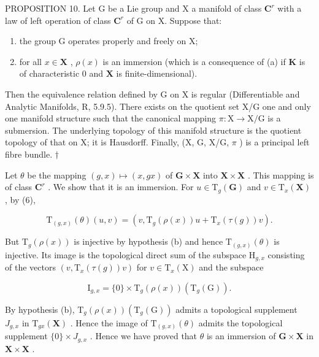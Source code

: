 PROPOSITION 10. Let G be a Lie group and X a manifold of class \(\mathbf{C}^r\) with a law of left operation of class \(\mathbf{C}^r\) of G on X. Suppose that:

\begin{enumerate}
\def\labelenumi{(\alph{enumi})}
\item
  the group G operates properly and freely on X;
\item
  for all \(x \in \mathbf{X}\) , \(\rho(x)\) is an immersion (which is a consequence of (a) if \(\mathbf{K}\) is of characteristic 0 and \(\mathbf{X}\) is finite-dimensional).
\end{enumerate}

Then the equivalence relation defined by G on X is regular (Differentiable and Analytic Manifolds, R, 5.9.5). There exists on the quotient set X/G one and only one manifold structure such that the canonical mapping \(\pi: \mathrm{X} \to \mathrm{X} / \mathrm{G}\) is a submersion. The underlying topology of this manifold structure is the quotient topology of that on X; it is Hausdorff. Finally, (X, G, X/G, \(\pi\) ) is a principal left fibre bundle. \(\dagger\)

Let \(\theta\) be the mapping \((g, x) \mapsto (x, gx)\) of \(\mathbf{G} \times \mathbf{X}\) into \(\mathbf{X} \times \mathbf{X}\) . This mapping is of class \(\mathbf{C}^r\) . We show that it is an immersion. For \(u \in \mathrm{T}_g(\mathbf{G})\) and \(v \in \mathrm{T}_x(\mathbf{X})\) , by (6),

\[
\mathrm{T} _ {(g, x)} (\theta) (u, v) = (v, \mathrm{T} _ {g} (\rho (x)) u + \mathrm{T} _ {x} (\tau (g)) v).\tag{7}
\]

But \(\mathrm{T}_{g}(\rho(x))\) is injective by hypothesis (b) and hence \(\mathrm{T}_{(g,x)}(\theta)\) is injective. Its image is the topological direct sum of the subspace \(\mathrm{H}_{g,x}\) consisting of the vectors \((v,\mathrm{T}_x(\tau(g))v)\) for \(v\in \mathrm{T}_x(\mathrm{X})\) and the subspace

\[
\mathrm{I} _ {g, x} = \{0 \} \times \mathrm{T} _ {g} (\rho (x)) (\mathrm{T} _ {g} (\mathrm{G})).
\]

By hypothesis (b), \(\mathrm{T}_g(\rho(x))(\mathrm{T}_g(\mathrm{G}))\) admits a topological supplement \(J_{g,x}\) in \(\mathrm{T}_{gx}(\mathbf{X})\) . Hence the image of \(\mathrm{T}_{(g,x)}(\theta)\) admits the topological supplement \(\{0\} \times J_{g,x}\) . Hence we have proved that \(\theta\) is an immersion of \(\mathbf{G} \times \mathbf{X}\) in \(\mathbf{X} \times \mathbf{X}\) .

